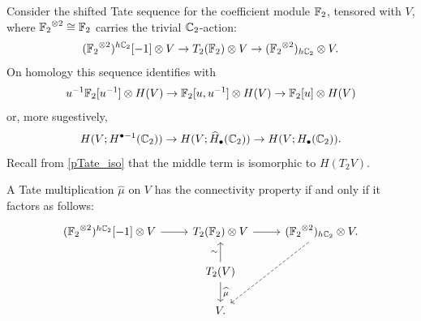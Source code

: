 Consider the shifted Tate sequence for the coefficient module \({\mathbb{F}_2}\), tensored with \(V\), where \({\mathbb{F}_2}^{\otimes 2} \cong {\mathbb{F}_2}\) carries the trivial \(\mathbb{C}_2\)-action:
\[
({\mathbb{F}_2}^{\otimes 2})^{h\mathbb{C}_2}[-1] \otimes V \to T_2({\mathbb{F}_2}) \otimes V \to ({\mathbb{F}_2}^{\otimes 2})_{h\mathbb{C}_2} \otimes V.
\]
On homology this sequence identifies with
\[
u^{-1}{\mathbb{F}_2}[u^{-1}] \otimes H(V) \to {\mathbb{F}_2}[u,u^{-1}] \otimes H(V) \to {\mathbb{F}_2}[u] \otimes H(V)
\]
or, more sugestively,
\[
H(V; H^{\bullet-1}(\mathbb{C}_2)) \to H(V; \widehat H_{\bullet}(\mathbb{C}_2)) \to H(V; H_{\bullet}(\mathbb{C}_2)).
\]
Recall from \cref{pTate_iso} that the middle term is isomorphic to \(H(T_2 V)\).%

\begin{lemma}\label{lconnectivity}
	A Tate multiplication \(\widehat\mu\) on \(V\) has the connectivity property if and only if it factors as follows:
	\[
	\begin{tikzcd}[column sep=24pt]
		(\Ftwo^{\ot 2})^{h\cyc_2}[-1] \ot V \rar &
		T_2(\Ftwo) \ot V \arrow[r] &
		(\Ftwo^{\ot 2})_{h\cyc_2} \ot V. \arrow[dashed, ddl]\\
		& T_2(V) \dar["\widehat\mu"] \uar["\sim"]& \\
		& V. &
	\end{tikzcd}
	\]
\end{lemma}

